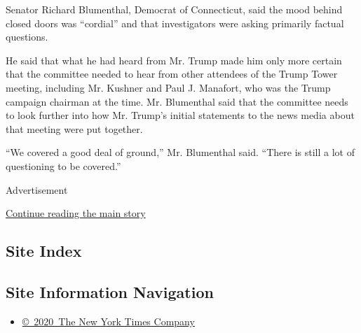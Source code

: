 Senator Richard Blumenthal, Democrat of Connecticut, said the mood
behind closed doors was ``cordial'' and that investigators were asking
primarily factual questions.

He said that what he had heard from Mr. Trump made him only more certain
that the committee needed to hear from other attendees of the Trump
Tower meeting, including Mr. Kushner and Paul J. Manafort, who was the
Trump campaign chairman at the time. Mr. Blumenthal said that the
committee needs to look further into how Mr. Trump's initial statements
to the news media about that meeting were put together.

``We covered a good deal of ground,'' Mr. Blumenthal said. ``There is
still a lot of questioning to be covered.''

Advertisement

\protect\hyperlink{after-bottom}{Continue reading the main story}

\hypertarget{site-index}{%
\subsection{Site Index}\label{site-index}}

\hypertarget{site-information-navigation}{%
\subsection{Site Information
Navigation}\label{site-information-navigation}}

\begin{itemize}
\tightlist
\item
  \href{https://help.nytimes3xbfgragh.onion/hc/en-us/articles/115014792127-Copyright-notice}{©~2020~The
  New York Times Company}
\end{itemize}

